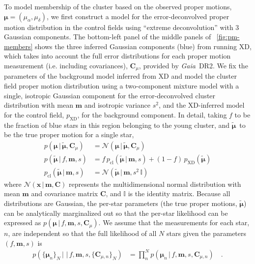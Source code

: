 \documentclass[modern]{aastex62}
\newcommand{\acronym}[1]{{\small{#1}}}
\newcommand{\gaia}{\textsl{Gaia}}
\newcommand{\DR}[1]{\acronym{DR#1}}
\newcommand{\bs}[1]{\boldsymbol{#1}}
\newcommand{\given}{\,|\,}
\newcommand{\norm}{\mathcal{N}}
\newcommand{\mat}[1]{\mathbf{#1}}
\newcommand{\truepm}{\ensuremath{\tilde{\bs{\mu}}}}
\begin{document}
To model membership of the cluster based on the observed proper motions, $\bs{\mu} = (\mu_\alpha, \mu_\delta)$, we first construct a model for the error-deconvolved proper motion distribution in the control fields using ``extreme deconvolution'' \citep[XD;][]{TODO} with 3 Gaussian components.
The bottom-left panel of the middle panels of \figurename~\ref{fig:pm-members} shows the three inferred Gaussian components (blue) from running XD, which takes into account the full error distributions for each proper motion measurement (i.e. including covariances), $\mat{C}_\mu$, provided by \gaia\ \DR{2}.
We fix the parameters of the background model inferred from XD and model the cluster field proper motion distribution using a two-component mixture model with a single, isotropic Gaussian component for the error-deconvolved cluster distribution with mean $\bs{m}$ and isotropic variance $s^2$, and the XD-inferred model for the control field, $p_{\textrm{XD}}$, for the background component.
In detail, taking $f$ to be the fraction of blue stars in this region belonging to the young cluster, and \truepm\ to be the true proper motion for a single star,
\begin{align}
    p(\bs{\mu} \given \truepm, \mat{C}_\mu) &=
        \norm(\bs{\mu} \given \truepm, \mat{C}_\mu)\\
    p(\truepm \given f, \bs{m}, s) &=
        f \, p_{\textrm{cl}}(\truepm \given \bs{m}, s)
        + (1-f) \, p_{\textrm{XD}}(\truepm)\\
    p_{\textrm{cl}}(\truepm \given \bs{m}, s) &=
        \norm(\truepm \given \bs{m}, s^2 \, \mathbb{I})
\end{align}
where $\norm(\bs{x} \given \bs{m}, \mat{C})$ represents the multidimensional normal distribution with mean $\bs{m}$ and covariance matrix $\mat{C}$, and $\mathbb{I}$ is the identity matrix.
Because all distributions are Gaussian, the per-star parameters (the true proper motions, \truepm) can be analytically marginalized out so that the per-star likelihood can be expressed as $p(\bs{\mu} \given f, \bs{m}, s, \mat{C}_\mu)$.
We assume that the measurements for each star, $n$, are independent so that the full likelihood of all $N$ stars given the parameters $(f, \bs{m}, s)$ is
\begin{align}
    p(\{\bs{\mu}_n\}_N \given \given f, \bs{m}, s, \{\mat{C}_{\mu, n}\}_N) &=
        \prod_n^N p(\bs{\mu}_n \given f, \bs{m}, s, \mat{C}_{\mu, n}) \quad .
        \label{eq:likelihood}
\end{align}
\end{document}
